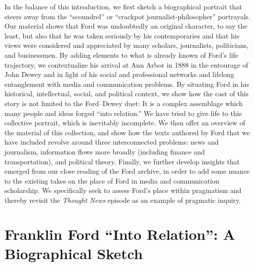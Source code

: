\documentclass[openany,nobib]{tufte-book}
\begin{document}
In the balance of this introduction, we first sketch a biographical
portrait that steers away from the ``scoundrel'' or ``crackpot
journalist-philosopher'' portrayals. Our material shows that Ford was
undoubtedly an original character, to say the least, but also that he
was taken seriously by his contemporaries and that his views were
considered and appreciated by many scholars, journalists, politicians,
and businessmen. By adding elements to what is already known of Ford's
life trajectory, we contextualize his arrival at Ann Arbor in 1888 in
the entourage of John Dewey and in light of his social and professional
networks and lifelong entanglement with media and communication
problems. By situating Ford in his historical, intellectual, social, and
political context, we show how the cast of this story is not limited to
the Ford--Dewey duet: It is a complex assemblage which many people and
ideas forged ``into relation.'' We have tried to give life to this
collective portrait, which is inevitably incomplete. We then offer an
overview of the material of this collection, and show how the texts
authored by Ford that we have included revolve around three
interconnected problems: news and journalism, information flows more
broadly (including finance and transportation), and political theory.
Finally, we further develop insights that emerged from our close reading
of the Ford archive, in order to add some nuance to the existing takes
on the place of Ford in media and communication scholarship. We
specifically seek to assess Ford's place within pragmatism and thereby
revisit the \emph{Thought News} episode as an example of pragmatic
inquiry.

\newpage\hypertarget{franklin-ford-into-relation-a-biographical-sketch}{%
\section{Franklin Ford ``Into Relation'': A\\\noindent Biographical
Sketch}\label{franklin-ford-into-relation-a-biographical-sketch}}
\end{document}
